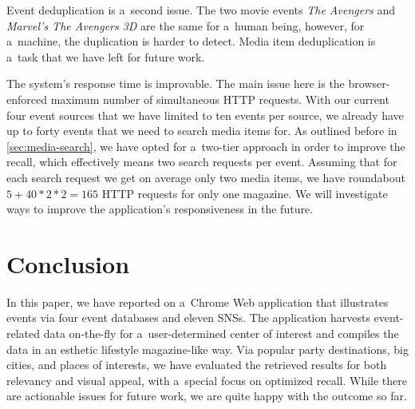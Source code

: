 \documentclass{acm_proc_article-sp}
\let\oldemph\emph
\renewcommand{\emph}[1]{\oldemph{\fontsize{9}{9}\selectfont #1}}
\begin{document}
Event deduplication is a~second issue.
The two movie events \emph{The Avengers} and
\emph{Marvel's The Avengers 3D} are the same for a~human being,
however, for a~machine, the duplication is harder to detect.
Media item deduplication is a~task that we have left for future work.

The system's response time is improvable.
The main issue here is the browser-enforced maximum number
of simultaneous HTTP requests.
With our current four event sources that we have limited
to ten events per source, we already have up to forty events
that we need to search media items for.
As outlined before in \autoref{sec:media-search},
we have opted for a~two-tier approach in order to improve the recall,
which effectively means two search requests per event.
Assuming that for each search request we get on average only two media items,
we have roundabout $5+40*2*2=165$ HTTP requests for only one magazine.
We will investigate ways to improve the application's responsiveness
in the future.

\section{Conclusion}
In this paper, we have reported on a~Chrome Web application that
illustrates events via four event databases and eleven SNSs.
The application harvests event-related data on-the-fly for
a~user-determined center of interest and compiles the data
in an esthetic lifestyle magazine-like way.
Via popular party destinations, big cities, and places of interests,
we have evaluated the retrieved results for both relevancy and
visual appeal, with a~special focus on optimized recall.
While there are actionable issues for future work,
we are quite happy with the outcome so far.





\balancecolumns
\end{document}

